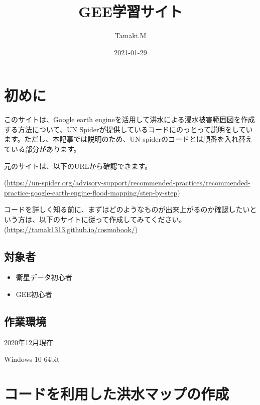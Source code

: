 \documentclass[
]{book}
\title{GEE学習サイト}
\author{Tamaki.M}
\date{2021-01-29}
\begin{document}
\maketitle

{
\setcounter{tocdepth}{1}
\tableofcontents
}
\hypertarget{ux521dux3081ux306b}{%
\chapter*{初めに}\label{ux521dux3081ux306b}}

このサイトは、Google earth engineを活用して洪水による浸水被害範囲図を作成する方法について、UN Spiderが提供しているコードにのっとって説明をしています。ただし、本記事では説明のため、UN spiderのコードとは順番を入れ替えている部分があります。

元のサイトは、以下のURLから確認できます。

(\url{https://un-spider.org/advisory-support/recommended-practices/recommended-practice-google-earth-engine-flood-mapping/step-by-step})

コードを詳しく知る前に、まずはどのようなものが出来上がるのか確認したいという方は、以下のサイトに従って作成してみてください。\\
(\url{https://tamak1313.github.io/cosmobook/})

\hypertarget{ux5bfeux8c61ux8005}{%
\section{対象者}\label{ux5bfeux8c61ux8005}}

\begin{itemize}
\item
  衛星データ初心者
\item
  GEE初心者
\end{itemize}

\hypertarget{ux4f5cux696dux74b0ux5883}{%
\section{作業環境}\label{ux4f5cux696dux74b0ux5883}}

2020年12月現在

Windows 10 64bit

\hypertarget{ux30b3ux30fcux30c9ux3092ux5229ux7528ux3057ux305fux6d2aux6c34ux30deux30c3ux30d7ux306eux4f5cux6210}{%
\chapter{コードを利用した洪水マップの作成}\label{ux30b3ux30fcux30c9ux3092ux5229ux7528ux3057ux305fux6d2aux6c34ux30deux30c3ux30d7ux306eux4f5cux6210}}
\end{document}
